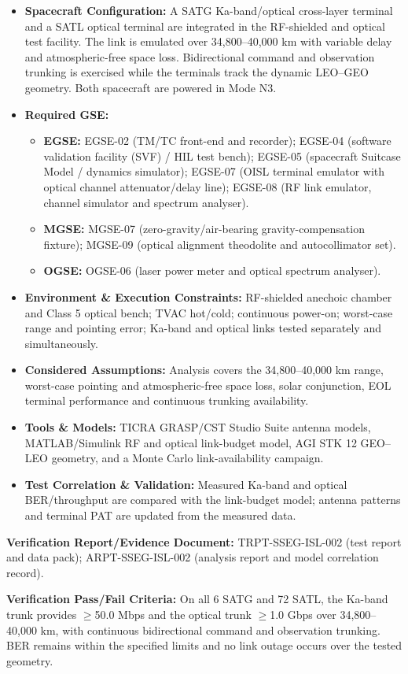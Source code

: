 \begin{itemize}
\item \textbf{Spacecraft Configuration:} A SATG Ka-band/optical cross-layer terminal and a SATL optical terminal are integrated in the RF-shielded and optical test facility. The link is emulated over 34,800--40,000 km with variable delay and atmospheric-free space loss. Bidirectional command and observation trunking is exercised while the terminals track the dynamic LEO--GEO geometry. Both spacecraft are powered in Mode N3.
\item \textbf{Required GSE:}
\begin{itemize}
\item \textbf{EGSE:} EGSE-02 (TM/TC front-end and recorder); EGSE-04 (software validation facility (SVF) / HIL test bench); EGSE-05 (spacecraft Suitcase Model / dynamics simulator); EGSE-07 (OISL terminal emulator with optical channel attenuator/delay line); EGSE-08 (RF link emulator, channel simulator and spectrum analyser).
\item \textbf{MGSE:} MGSE-07 (zero-gravity/air-bearing gravity-compensation fixture); MGSE-09 (optical alignment theodolite and autocollimator set).
\item \textbf{OGSE:} OGSE-06 (laser power meter and optical spectrum analyser).
\end{itemize}
\item \textbf{Environment \& Execution Constraints:} RF-shielded anechoic chamber and Class 5 optical bench; TVAC hot/cold; continuous power-on; worst-case range and pointing error; Ka-band and optical links tested separately and simultaneously.
\item \textbf{Considered Assumptions:} Analysis covers the 34,800--40,000 km range, worst-case pointing and atmospheric-free space loss, solar conjunction, EOL terminal performance and continuous trunking availability.
\item \textbf{Tools \& Models:} TICRA GRASP/CST Studio Suite antenna models, MATLAB/Simulink RF and optical link-budget model, AGI STK 12 GEO--LEO geometry, and a Monte Carlo link-availability campaign.
\item \textbf{Test Correlation \& Validation:} Measured Ka-band and optical BER/throughput are compared with the link-budget model; antenna patterns and terminal PAT are updated from the measured data.
\end{itemize}
\par\textbf{Verification Report/Evidence Document:} TRPT-SSEG-ISL-002 (test report and data pack); ARPT-SSEG-ISL-002 (analysis report and model correlation record).
\par\textbf{Verification Pass/Fail Criteria:} On all 6 SATG and 72 SATL, the Ka-band trunk provides $\ge$50.0 Mbps and the optical trunk $\ge$1.0 Gbps over 34,800--40,000 km, with continuous bidirectional command and observation trunking. BER remains within the specified limits and no link outage occurs over the tested geometry.
\par\medskip
